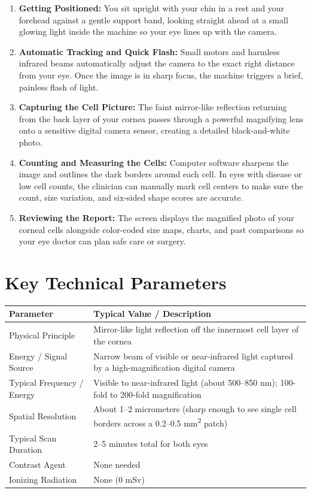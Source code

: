 \begin{enumerate}
    \item \textbf{Getting Positioned:} You sit upright with your chin in a rest and your forehead against a gentle support band, looking straight ahead at a small glowing light inside the machine so your eye lines up with the camera.
    \item \textbf{Automatic Tracking and Quick Flash:} Small motors and harmless infrared beams automatically adjust the camera to the exact right distance from your eye. Once the image is in sharp focus, the machine triggers a brief, painless flash of light.
    \item \textbf{Capturing the Cell Picture:} The faint mirror-like reflection returning from the back layer of your cornea passes through a powerful magnifying lens onto a sensitive digital camera sensor, creating a detailed black-and-white photo.
    \item \textbf{Counting and Measuring the Cells:} Computer software sharpens the image and outlines the dark borders around each cell. In eyes with disease or low cell counts, the clinician can manually mark cell centers to make sure the count, size variation, and six-sided shape scores are accurate.
    \item \textbf{Reviewing the Report:} The screen displays the magnified photo of your corneal cells alongside color-coded size maps, charts, and past comparisons so your eye doctor can plan safe care or surgery.
\end{enumerate}

\section{Key Technical Parameters}

\noindent
\begin{tabularx}{\textwidth}{@{}l X@{}}
\toprule
\textbf{Parameter} & \textbf{Typical Value / Description} \\
\midrule
Physical Principle & Mirror-like light reflection off the innermost cell layer of the cornea \\
Energy / Signal Source & Narrow beam of visible or near-infrared light captured by a high-magnification digital camera \\
Typical Frequency / Energy & Visible to near-infrared light (about 500--850 nm); 100-fold to 200-fold magnification \\
Spatial Resolution & About 1--2 micrometers (sharp enough to see single cell borders across a 0.2--0.5 mm\textsuperscript{2} patch) \\
Typical Scan Duration & 2--5 minutes total for both eyes \\
Contrast Agent & None needed \\
Ionizing Radiation & None (0 mSv) \\
\bottomrule
\end{tabularx}

